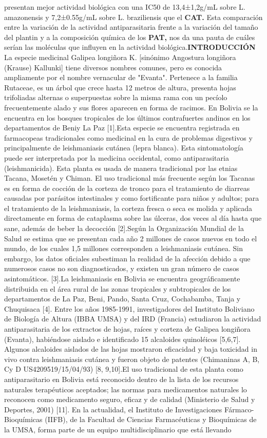 \documentclass{article}
\begin{document}
presentan mejor actividad biológica con una IC50 de 13,4±1,2g/mL sobre L. amazonensis y 7,2±0.55g/mL sobre L. braziliensis que el \textbf{CAT. }
Esta comparación entre la variación de la actividad antiparasitaria frente a la variación del tamaño del plantin y a la composición química de los \textbf{PAT, }
nos da una pauta de cuáles serían las moléculas que influyen en la actividad biológica.\textbf{INTRODUCCIÓN}
La especie medicinal Galipea longiñora K. [sinónimo Angostura longiñora (Krause) Kallunki] tiene diversos nombres comunes, pero es conocida ampliamente por el nombre vernacular de "Evanta". Pertenece a la familia Rutaceae, es un árbol que crece hasta 12 metros de altura, presenta hojas trifoliadas alternas o superpuestas sobre la misma rama con un pecíolo frecuentemente alado y sus flores aparecen en forma de racimos. En Bolivia se la encuentra en los bosques tropicales de los últimos contrafuertes andinos en los departamentos de Beniy La Paz [1].Esta especie se encuentra registrada en farmacopeas tradicionales como medicinal en la cura de problemas digestivos y principalmente de leishmaniasis cutánea (lepra blanca). Esta sintomatología puede ser interpretada por la medicina occidental, como antiparasitaria (leishmanicida). Esta planta es usada de manera tradicional por las etnias Tacana, Mosetén y Chiman. El uso tradicional más frecuente según los Tacanas es en forma de cocción de la corteza de tronco para el tratamiento de diarreas causadas por parásitos intestinales y como fortificante para niños y adultos; para el tratamiento de la leishmaniasis, la corteza fresca o seca es molida y aplicada directamente en forma de cataplasma sobre las úlceras, dos veces al día hasta que sane, además de beber la decocción [2].Según la Organización Mundial de la Salud se estima que se presentan cada año 2 millones de casos nuevos en todo el mundo, de los cuales 1,5 millones corresponden a leishmaniasis cutánea. Sin embargo, los datos oficiales subestiman la realidad de la afección debido a que numerosos casos no son diagnosticados, y existen un gran número de casos asintomáticos. [3].La leishmaniasis en Bolivia se encuentra geográficamente distribuida en el área rural de las zonas tropicales y subtropicales de los departamentos de La Paz, Beni, Pando, Santa Cruz, Cochabamba, Tanja y Chuquisaca [4]. Entre los años 1985-1991, investigadores del Instituto Boliviano de Biología de Altura (IBBA UMSA) y del IRD (Francia) estudiaron la actividad antiparasitaria de los extractos de hojas, raíces y corteza de Galipea longiñora (Evanta), habiéndose aislado e identificado 15 alcaloides quinoléicos [5,6,7]. Algunos alcaloides aislados de las hojas mostraron eficacidad y baja toxicidad in vivo contra leishmaniasis cutánea y fueron objeto de patentes (Chimaninas A, B, Cy D US4209519/15/04/93) [8, 9,10].El uso tradicional de esta planta como antiparasitario en Bolivia está reconocido dentro de la lista de los recursos naturales terapéuticos aceptados; las normas para medicamentos naturales lo reconocen como medicamento seguro, eficaz y de calidad (Ministerio de Salud y Deportes, 2001) [11]. En la actualidad, el Instituto de Investigaciones Fármaco-Bioquímicas (IIFB), de la Facultad de Ciencias Farmacéuticas y Bioquímicas de la UMSA, forma parte de un equipo multidisciplinario que está llevando 
\end{document}
